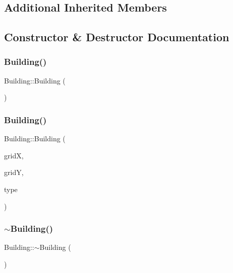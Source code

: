 \subsection*{Additional Inherited Members}


\subsection{Constructor \& Destructor Documentation}
\mbox{\label{class_building_ab570ec0a203ee621f9f522c678a147d9}} 
\subsubsection{\texorpdfstring{Building()}{Building()}\hspace{0.1cm}{\footnotesize\ttfamily [1/2]}}
{\footnotesize\ttfamily Building\+::\+Building (\begin{DoxyParamCaption}{ }\end{DoxyParamCaption})}

\mbox{\label{class_building_acd27fcb248c0a2d7b4744c937877ba01}} 
\subsubsection{\texorpdfstring{Building()}{Building()}\hspace{0.1cm}{\footnotesize\ttfamily [2/2]}}
{\footnotesize\ttfamily Building\+::\+Building (\begin{DoxyParamCaption}\item[{uint16\+\_\+t}]{gridX,  }\item[{uint16\+\_\+t}]{gridY,  }\item[{\hyperlink{class_building_type}{Building\+Type} $\ast$}]{type }\end{DoxyParamCaption})}

\mbox{\label{class_building_ab675c6a382e110b84031956cda708439}} 
\subsubsection{\texorpdfstring{$\sim$\+Building()}{~Building()}}
{\footnotesize\ttfamily Building\+::$\sim$\+Building (\begin{DoxyParamCaption}{ }\end{DoxyParamCaption})\hspace{0.3cm}{\ttfamily [virtual]}}



